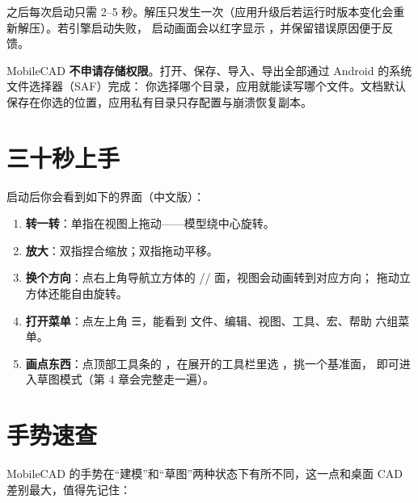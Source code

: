 之后每次启动只需 2--5 秒。解压只发生一次（应用升级后若运行时版本变化会重新解压）。若引擎启动失败，
启动画面会以红字显示 ，并保留错误原因便于反馈。

\begin{tip}[不需要存储权限]
MobileCAD \textbf{不申请存储权限}。打开、保存、导入、导出全部通过 Android 的系统文件选择器（SAF）完成：
你选择哪个目录，应用就能读写哪个文件。文档默认保存在你选的位置，应用私有目录只存配置与崩溃恢复副本。
\end{tip}

\section{三十秒上手}

启动后你会看到如下的界面（中文版）：


\begin{enumerate}
  \item \textbf{转一转}：单指在视图上拖动——模型绕中心旋转。
  \item \textbf{放大}：双指捏合缩放；双指拖动平移。
  \item \textbf{换个方向}：点右上角导航立方体的 // 面，视图会动画转到对应方向；
        拖动立方体还能自由旋转。
  \item \textbf{打开菜单}：点左上角 ☰，能看到 文件、编辑、视图、工具、宏、帮助 六组菜单。
  \item \textbf{画点东西}：点顶部工具条的 ，在展开的工具栏里选 ，挑一个基准面，
        即可进入草图模式（第 4 章会完整走一遍）。
\end{enumerate}

\section{手势速查}

MobileCAD 的手势在“建模”和“草图”两种状态下有所不同，这一点和桌面 CAD 差别最大，值得先记住：


